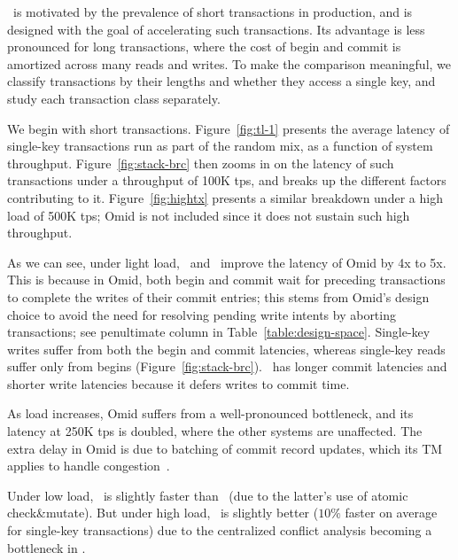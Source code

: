 %
\sys\ is motivated by the prevalence of short transactions in production, and is designed with
the goal of accelerating such transactions.
Its advantage is less pronounced for long transactions, where the cost of begin and commit is amortized
across many reads and writes.
To make the comparison meaningful, we classify transactions by their lengths and whether they
access a single key, and study each transaction class separately. 

We begin with short transactions. 
Figure~\ref{fig:tl-1} presents the average latency of single-key transactions run as part of the random mix,
as a function of {system} throughput.
Figure~\ref{fig:stack-brc}  then zooms in on the latency of such transactions under 
a throughput of 100K tps, and breaks up the different factors contributing to it. 
Figure~\ref{fig:hightx}  presents a similar breakdown under a high load of 500K tps; Omid 
is not included since it does not sustain such high throughput.

As we can see, under light load, \sysll\ and \syspc\ improve the latency of Omid by 4x to 5x.
This is because in Omid, both begin and commit wait for preceding transactions to complete the writes of 
their commit entries; this stems from Omid's design choice to avoid the need for resolving pending write intents
by aborting transactions; see penultimate column in Table~\ref{table:design-space}. 
Single-key writes suffer from both the begin and commit latencies, whereas single-key reads  
suffer only from begins (Figure~\ref{fig:stack-brc}). \syspc\ has longer commit latencies and shorter write latencies
because it defers writes to commit time.

As load increases, Omid suffers from a well-pronounced bottleneck, and its latency at 250K tps is doubled, where the other systems
are unaffected. The extra delay in Omid is due to batching of commit record updates, 
which its TM applies to handle congestion~\cite{Omid2017}. 

Under low load, \sysll\ is slightly faster than \syspc\ (due to the latter's use of atomic check\&mutate). 
But under high load, \syspc\ is slightly better ($10\%$ faster on average for single-key transactions)   
due to the centralized conflict analysis becoming a bottleneck in \sysll.

